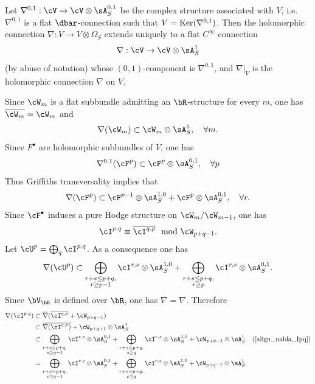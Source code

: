\documentclass[11pt,letterpaper]{amsart}
\numberwithin{equation}{section}
\begin{document}
	Let $\nabla^{0,1}:\cV\to\cV\otimes\sA^{0,1}_S$ be the complex structure associated with $V$, i.e. $\nabla^{0,1}$ is a flat $\dbar$-connection such that $V={\rm Ker}(\nabla^{0,1})$. Then the holomorphic connection $\nabla:V\to V\otimes\Omega_S$ extends uniquely to a flat $C^\infty$ connection
	$$\nabla:\cV\to\cV\otimes\sA^1_S$$
	(by abuse of notation) whose $(0,1)$-component is $\nabla^{0,1}$, and $\nabla|_V$ is the holomorphic connection  $\nabla$  on $V$.
	
	Since $\cW_m$ is a flat subbundle admitting an $\bR$-structure for every $m$, one has $\overline{\cW_m}=\cW_m$ and
	\begin{align*}
		\nabla(\cW_m)\subset\cW_m\otimes\sA^1_S,\quad \forall m.
	\end{align*}
	Since $F^\bullet$ are holomorphic subbundles of $V$, one has $$\nabla^{0,1}(\cF^p)\subset \cF^p\otimes\sA^{0,1}_S,\quad\forall p$$
	Thus Griffiths transversality implies that
	\begin{align*}
		\nabla(\cF^p)\subset \cF^{p-1}\otimes\sA^{1,0}_S+\cF^p\otimes\sA^{0,1}_S,\quad\forall r.
	\end{align*}
	Since $\cF^\bullet$ induces a pure Hodge structure on $\cW_m/\cW_{m-1}$, one has
	\begin{align*}
		\cI^{p,q}\equiv\overline{\cI^{q,p}}\mod \cW_{p+q-1}.
	\end{align*}
	Let $\cU^p=\bigoplus_q\cI^{p,q}$.
	As a consequence one has
	\begin{align}\label{align_nabla_Ipq}
		\nabla(\cU^p)\subset\bigoplus_{\substack{r+s\leq p+q, \\ r\geq p-1}}\cI^{r,s}\otimes\sA^{1,0}_S+\bigoplus_{\substack{r+s\leq p+q, \\ r\geq p}}\cI^{r,s}\otimes\sA^{0,1}_S.
	\end{align}
	Since $\bV_\bR$ is defined over $\bR$, one has $\overline{\nabla}=\nabla$. Therefore
	\begin{align}
		\nabla(\cI^{p,q})&\subset\overline{\nabla}(\overline{\cI^{q,p}}+ \cW_{p+q-1})\\\nonumber
		&\subset\overline{\nabla(\cI^{q,p})}+\cW_{p+q+1}\otimes\sA^1_S\\\nonumber
		&\subset\bigoplus_{\substack{r+s\leq p+q, \\ s\geq q-1}}\cI^{r,s}\otimes\sA^{0,1}_S+\bigoplus_{\substack{r+s\leq p+q, \\ s\geq q}}\cI^{r,s}\otimes\sA^{1,0}_S+\cW_{p+q-1}\otimes\sA^1_S\quad(\ref{align_nabla_Ipq})\\\nonumber
		&=\bigoplus_{\substack{r+s=p+q, \\ s\geq q-1}}\cI^{r,s}\otimes\sA^{0,1}_S+\bigoplus_{\substack{r+s=p+q, \\ s\geq q}}\cI^{r,s}\otimes\sA^{1,0}_S+\cW_{p+q-1}\otimes\sA^1_S
	\end{align}
\end{document}
